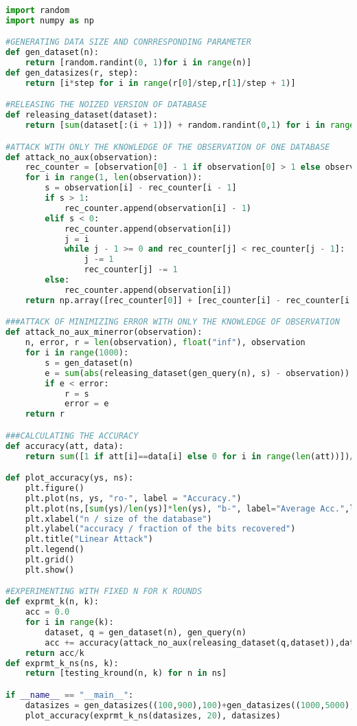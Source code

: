 
\begin{lstlisting}[label=code-p1-1, language=Python, caption=Python Code For Problem 1 - 1, Attack without Side Information]
import random
import numpy as np

#GENERATING DATA SIZE AND CONRRESPONDING PARAMETER
def gen_dataset(n):
	return [random.randint(0, 1)for i in range(n)]
def gen_datasizes(r, step):
	return [i*step for i in range(r[0]/step,r[1]/step + 1)]

#RELEASING THE NOIZED VERSION OF DATABASE
def releasing_dataset(dataset):
	return [sum(dataset[:(i + 1)]) + random.randint(0,1) for i in range(len(dataset))]

#ATTACK WITH ONLY THE KNOWLEDGE OF THE OBSERVATION OF ONE DATABASE
def attack_no_aux(observation):
	rec_counter = [observation[0] - 1 if observation[0] > 1 else observation[0]]
	for i in range(1, len(observation)):
		s = observation[i] - rec_counter[i - 1]
		if s > 1:
			rec_counter.append(observation[i] - 1)
		elif s < 0:
			rec_counter.append(observation[i])
			j = i
			while j - 1 >= 0 and rec_counter[j] < rec_counter[j - 1]:
				j -= 1
				rec_counter[j] -= 1
		else:
			rec_counter.append(observation[i])
	return np.array([rec_counter[0]] + [rec_counter[i] - rec_counter[i - 1] for i in range(1, len(observation))])

###ATTACK OF MINIMIZING ERROR WITH ONLY THE KNOWLEDGE OF OBSERVATION
def attack_no_aux_minerror(observation):
	n, error, r = len(observation), float("inf"), observation
	for i in range(1000):
		s = gen_dataset(n)
		e = sum(abs(releasing_dataset(gen_query(n), s) - observation))
		if e < error:
			r = s
			error = e
	return r

###CALCULATING THE ACCURACY
def accuracy(att, data):
	return sum([1 if att[i]==data[i] else 0 for i in range(len(att))])/(len(att)*1.0)

def plot_accuracy(ys, ns):
	plt.figure()
	plt.plot(ns, ys, "ro-", label = "Accuracy.")
	plt.plot(ns,[sum(ys)/len(ys)]*len(ys), "b-", label="Average Acc.",linewidth=3.0)
	plt.xlabel("n / size of the database")
	plt.ylabel("accuracy / fraction of the bits recovered")
	plt.title("Linear Attack")
	plt.legend()
	plt.grid()
	plt.show()

#EXPERIMENTING WITH FIXED N FOR K ROUNDS
def exprmt_k(n, k):
	acc = 0.0
	for i in range(k):
		dataset, q = gen_dataset(n), gen_query(n)
		acc += accuracy(attack_no_aux(releasing_dataset(q,dataset)),dataset)
	return acc/k
def exprmt_k_ns(ns, k):
	return [testing_kround(n, k) for n in ns]

if __name__ == "__main__":
	datasizes = gen_datasizes((100,900),100)+gen_datasizes((1000,5000),200)+[50000]
	plot_accuracy(exprmt_k_ns(datasizes, 20), datasizes)

\end{lstlisting}


